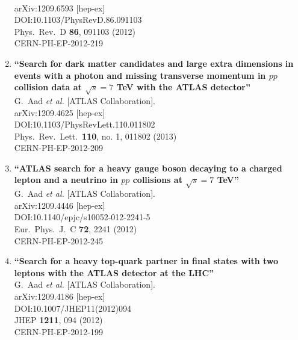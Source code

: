 \documentclass{article}
\begin{document}
\begin{enumerate}
  \\{}arXiv:1209.6593 [hep-ex]
  \\{}DOI:10.1103/PhysRevD.86.091103
  \\{}Phys.\ Rev.\ D {\bf 86}, 091103 (2012)
  \\{}CERN-PH-EP-2012-219
\item%
{\bf ``Search for dark matter candidates and large extra dimensions in events with a photon and missing transverse momentum in $pp$ collision data at $\sqrt{s}=7$ TeV with the ATLAS detector''}
  \\{}G.~Aad {\it et al.} [ATLAS Collaboration].
  \\{}arXiv:1209.4625 [hep-ex]
  \\{}DOI:10.1103/PhysRevLett.110.011802
  \\{}Phys.\ Rev.\ Lett.\  {\bf 110}, no. 1, 011802 (2013)
  \\{}CERN-PH-EP-2012-209
\item%
{\bf ``ATLAS search for a heavy gauge boson decaying to a charged lepton and a neutrino in $pp$ collisions at $\sqrt{s}=7$ TeV''}
  \\{}G.~Aad {\it et al.} [ATLAS Collaboration].
  \\{}arXiv:1209.4446 [hep-ex]
  \\{}DOI:10.1140/epjc/s10052-012-2241-5
  \\{}Eur.\ Phys.\ J.\ C {\bf 72}, 2241 (2012)
  \\{}CERN-PH-EP-2012-245
\item%
{\bf ``Search for a heavy top-quark partner in final states with two leptons with the ATLAS detector at the LHC''}
  \\{}G.~Aad {\it et al.} [ATLAS Collaboration].
  \\{}arXiv:1209.4186 [hep-ex]
  \\{}DOI:10.1007/JHEP11(2012)094
  \\{}JHEP {\bf 1211}, 094 (2012)
  \\{}CERN-PH-EP-2012-199

\end{enumerate}
\end{document}
